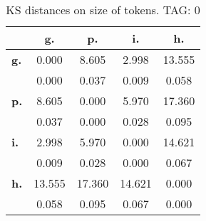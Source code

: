 \begin{table}[h!]
\begin{center}
\begin{tabular}{| l || c | c | c | c |}\hline
 & {\bf g.} & {\bf p.} & {\bf i.} & {\bf h.} \\\hline\hline
{\bf g.} & 0.000 & 8.605 & 2.998 & 13.555 \\
{\bf } & 0.000 & 0.037 & 0.009 & 0.058 \\\hline
{\bf p.} & 8.605 & 0.000 & 5.970 & 17.360 \\
{\bf } & 0.037 & 0.000 & 0.028 & 0.095 \\\hline
{\bf i.} & 2.998 & 5.970 & 0.000 & 14.621 \\
{\bf } & 0.009 & 0.028 & 0.000 & 0.067 \\\hline
{\bf h.} & 13.555 & 17.360 & 14.621 & 0.000 \\
{\bf } & 0.058 & 0.095 & 0.067 & 0.000 \\\hline
\end{tabular}
\caption{KS distances on size of tokens. TAG: 0}
\end{center}
\end{table}